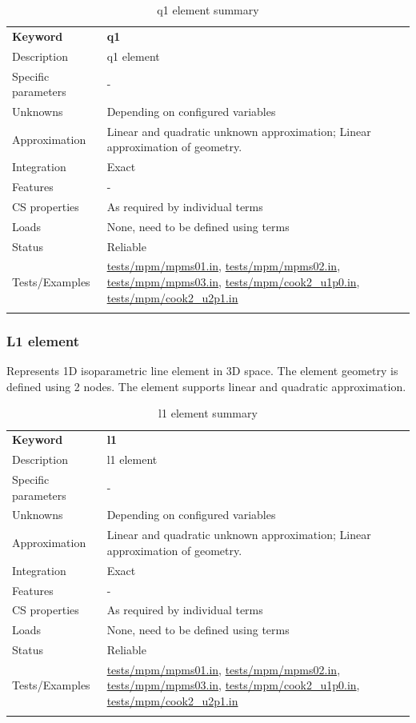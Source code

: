 \documentclass[a4paper]{article}
\newcommand{\templabel}{}%
\newcommand{\tempcaption}{}%
\newcounter{nelpar}
\newenvironment{elementsummary}[5]{%
  \gdef\tempcaption{#4}%
  \gdef\templabel{#5}%
  \setcounter{nelpar}{0}%
  \begin{center} %
    \begin{table}[!htb] %
      \begin{tabular}{|l|p{9cm}|}\hline %
        {\bf Keyword} & \bf{#1}\\ %
        {Description} & {#2}\\ %
        {Specific parameters} & {#3}\\ \hline %
}{
  \\ \hline %
      \end{tabular}%
      \caption{\tempcaption}%
      \label{\templabel}%
    \end{table}%
  \end{center}%
}
\newcommand{\elementDescription}[2]{{#1} & {#2}\\}
\begin{document}
\begin{elementsummary}{q1}{q1 element}{-}{q1 element summary}{q1summary}
\elementDescription{Unknowns}{Depending on configured variables}
\elementDescription{Approximation}{Linear and quadratic unknown approximation; Linear approximation of geometry.}
\elementDescription{Integration}{Exact}
\elementDescription{Features}{-}
\elementDescription{CS properties}{As required by individual terms}
\elementDescription{Loads}{None, need to be defined using terms}
\elementDescription{Status}{Reliable}
\elementDescription{Tests/Examples}{\href{https://github.com/oofem/oofem/blob/devel/tests/mpm/mpms01.in}{tests/mpm/mpms01.in},
\href{https://github.com/oofem/oofem/blob/devel/tests/mpm/mpms02.in}{tests/mpm/mpms02.in},
\href{https://github.com/oofem/oofem/blob/devel/tests/mpm/mpms03.in}{tests/mpm/mpms03.in},
\href{https://github.com/oofem/oofem/blob/devel/tests/mpm/cook2\_u1p0.in}{tests/mpm/cook2\_u1p0.in},
\href{https://github.com/oofem/oofem/blob/devel/tests/mpm/cook2\_u2p1.in}{tests/mpm/cook2\_u2p1.in}
}
\end{elementsummary}

\subsubsection{L1 element}
\label{L1}

Represents 1D isoparametric line element in 3D space. The element geometry is defined using 
2 nodes. The element supports linear and quadratic approximation. 

\begin{elementsummary}{l1}{l1 element}{-}{l1 element summary}{l1summary}
\elementDescription{Unknowns}{Depending on configured variables}
\elementDescription{Approximation}{Linear and quadratic unknown approximation; Linear approximation of geometry.}
\elementDescription{Integration}{Exact}
\elementDescription{Features}{-}
\elementDescription{CS properties}{As required by individual terms}
\elementDescription{Loads}{None, need to be defined using terms}
\elementDescription{Status}{Reliable}
\elementDescription{Tests/Examples}{\href{https://github.com/oofem/oofem/blob/devel/tests/mpm/mpms01.in}{tests/mpm/mpms01.in},
\href{https://github.com/oofem/oofem/blob/devel/tests/mpm/mpms02.in}{tests/mpm/mpms02.in},
\href{https://github.com/oofem/oofem/blob/devel/tests/mpm/mpms03.in}{tests/mpm/mpms03.in},
\href{https://github.com/oofem/oofem/blob/devel/tests/mpm/cook2\_u1p0.in}{tests/mpm/cook2\_u1p0.in},
\href{https://github.com/oofem/oofem/blob/devel/tests/mpm/cook2\_u2p1.in}{tests/mpm/cook2\_u2p1.in}
}
\end{elementsummary}
\end{document}
